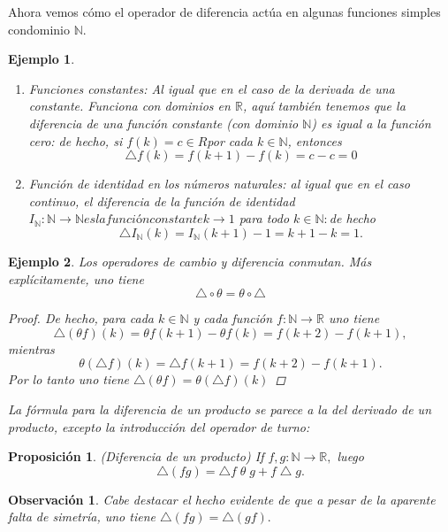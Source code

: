 \documentclass[a4,paper]{article}
\newtheorem{ejem}{Ejemplo}[section]
\newtheorem{obs}{Observación}[section]
\newtheorem{prop}{Proposición}[section]
\begin{document}
			Ahora vemos cómo el operador de diferencia actúa en algunas funciones simples condominio  $ \mathbb{N} $.
			\begin{ejem}
				\begin{enumerate}\\
				\vspace{2mm}
				\item Funciones constantes: Al igual que en el caso de la derivada de una  constante.
				Funciona con dominios en $ \mathbb{R} $, aquí también tenemos que la diferencia de
				una función constante (con dominio $ \mathbb{N} $) es igual a la función cero: de hecho, si
				$f(k) = c \in R $por cada $ k \in \mathbb{N}$, entonces
				$$
				\bigtriangleup f(k)=f(k+1)-f(k)=c-c=0 
				$$
				\item 
				Función de identidad en los números naturales: al igual que en el caso continuo, el diferencia de la función de identidad $I_{\mathbb{N}}: \mathbb{N} \to \mathbb{N} es la función constante k \to  1$ para todo $ k\in \mathbb{N}:$de hecho
				$$
				\bigtriangleup I_{\mathbb{N}}(k)=I_{\mathbb{N}}(k+1)-1= k+1-k=1.
				$$
				\end{enumerate}
			\newpage
			\end{ejem}
			\begin{ejem}
			Los operadores de cambio y diferencia conmutan. Más explícitamente, uno tiene
			$$
			\bigtriangleup \circ \theta = \theta \circ \bigtriangleup
			$$
			\begin{proof}
			De hecho, para cada $ k \in \mathbb{N} $ y cada función $f: \mathbb{N} \to \mathbb{R} $ uno tiene
			$$
			\bigtriangleup (\theta f) (k) = \theta f (k + 1) - \theta f (k) = f (k + 2) - f (k + 1),
			$$
			mientras
			$$
			\theta ( \bigtriangleup f)(k)=\bigtriangleup f(k+1)=f(k+2)-f(k+1).
			$$
			Por lo tanto uno tiene $ \bigtriangleup(\theta f)=\theta(\bigtriangleup f)(k)  $
			\end{proof}
			La fórmula para la diferencia de un producto se parece a la del derivado de un producto, excepto la introducción del operador de turno:
			\end{ejem}
		\begin{prop}
		(Diferencia de un producto) If $ f,g:\mathbb{N} \to \mathbb{R},$ luego 
		$$
		\bigtriangleup (fg)=\bigtriangleup f \; \theta \; g + f \bigtriangleup g.
		$$
		\end{prop}
	\begin{obs}
		Cabe destacar el hecho evidente de que a pesar de la aparente falta de simetría, uno tiene $\bigtriangleup (fg) = \bigtriangleup (gf).$
	\end{obs}
\end{document}
